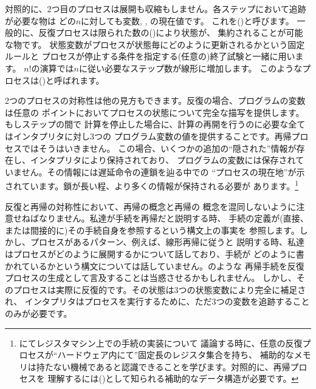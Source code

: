 対照的に、2つ目のプロセスは展開も収縮もしません。各ステップにおいて追跡が必要な物は
どの\( n \)に対しても変数, , の現在値です。
これを()と呼びます。
一般的に、反復プロセスは限られた数の()により状態が、
集約されることが可能な物です。
状態変数がプロセスが状態毎にどのように更新されるかという固定ルールと
プロセスが停止する条件を指定する(任意の)終了試験と一緒に用います。
\( n! \)の演算では\( n \)に従い必要なステップ数が線形に増加します。
このようなプロセスは()と呼ばれます。



2つのプロセスの対称性は他の見方もできます。反復の場合、プログラムの変数は任意の
ポイントにおいてプロセスの状態について完全な描写を提供します。もしステップの間で
計算を停止した場合に、計算の再開を行うのに必要な全てはインタプリタに対し3つの
プログラム変数の値を提供することです。再帰プロセスではそうはいきません。
この場合、いくつかの追加の``隠された''情報が存在し、インタプリタにより保持されており、
プログラムの変数には保存されていません。その情報には遅延命令の連鎖を辿る中での
``プロセスの現在地''が示されています。鎖が長い程、より多くの情報が保持される必要が
あります。\footnote{にてレジスタマシン上での手続の実装について
議論する時に、任意の反復プロセスが``ハードウェア内にて''固定長のレジスタ集合を持ち、
補助的なメモリは持たない機械であると認識できることを学びます。対照的に、再帰プロセスを
理解するには()として知られる補助的なデータ構造が必要です。}



反復と再帰の対称性において、再帰の概念と再帰の
概念を混同しないように注意せねばなりません。私達が手続を再帰だと説明する時、
手続の定義が(直接、または間接的に)その手続自身を参照するという構文上の事実を
参照します。しかし、プロセスがあるパターン、例えば、線形再帰に従うと
説明する時、私達はプロセスがどのように展開するかについて話しており、手続が
どのように書かれているかという構文については話していません。のような
再帰手続を反復プロセスの生成として言及することは当惑させるかもしれません。
しかし、そのプロセスは実際に反復的です。その状態は3つの状態変数により完全に補足され、
インタプリタはプロセスを実行するために、ただ3つの変数を追跡することのみが必要です。



